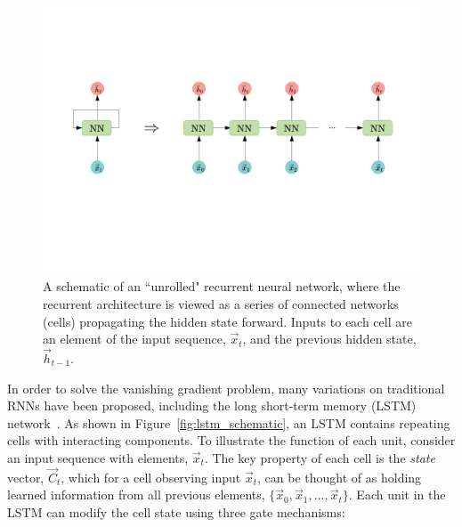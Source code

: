 \begin{figure}[htbp!] 
\centering 
\includegraphics[trim={2cm 6cm 2cm 5cm},clip,width =0.9\linewidth]{Figures/ML/RNN.pdf}
\caption[A schematic of a recurrent neural network.]{A schematic of an ``unrolled" recurrent neural network, where the recurrent architecture is viewed as a series of connected networks (cells) propagating the hidden state forward. Inputs to each cell are an element of the input sequence, $\vec{x}_{t}$, and the previous hidden state, $\vec{h}_{t-1}$.}
\label{fig:rnn_unrolled}
\end{figure}
      

In order to solve the vanishing gradient problem, many variations on traditional RNNs have been proposed, including the long short-term memory (LSTM) network~\cite{LSTM}. As shown in Figure~\ref{fig:lstm_schematic}, an LSTM contains repeating cells with interacting components. To illustrate the function of each unit, consider an input sequence with elements, $\vec{x}_{t}$. %
The key property of each cell is the \textit{state} vector, $\vec{C}_{t}$, which for a cell observing input $\vec{x}_{t}$, can be thought of as holding learned information from all previous elements, $\{\vec{x}_{0},\vec{x}_{1}, ..., \vec{x}_{t}\}$. Each unit in the LSTM can modify the cell state using three gate mechanisms:%

